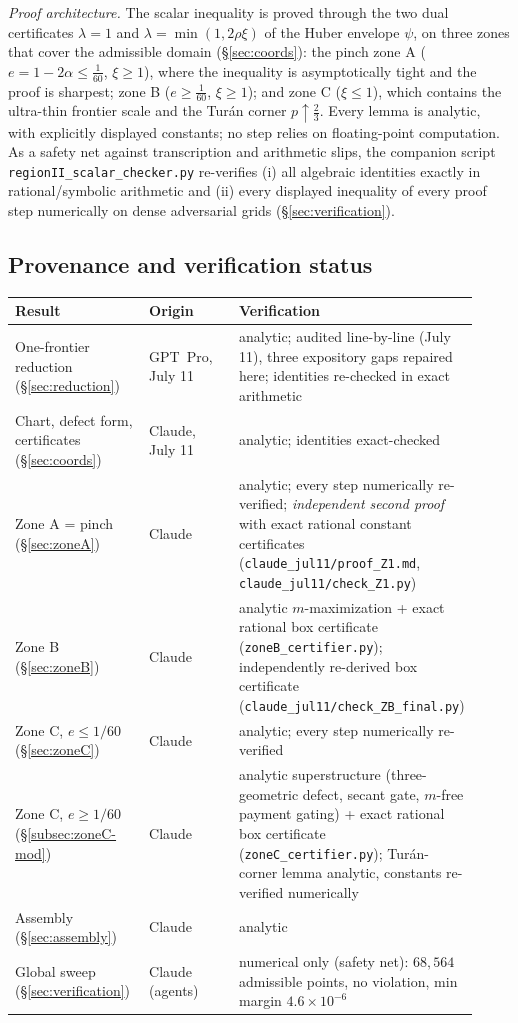 \documentclass[11pt]{article}
\begin{document}
\emph{Proof architecture.}  The scalar inequality is proved through the two
dual certificates $\lambda=1$ and $\lambda=\min(1,2\rho\xi)$ of the Huber
envelope $\psi$, on three zones that cover the admissible domain
(\S\ref{sec:coords}): the pinch zone A ($e=1-2\alpha\le\tfrac1{60}$,
$\xi\ge1$), where the inequality is asymptotically tight and the proof is
sharpest; zone B ($e\ge\tfrac1{60}$, $\xi\ge1$); and zone C ($\xi\le1$),
which contains the ultra-thin frontier scale and the Tur\'an corner
$p\uparrow\tfrac23$.  Every lemma is analytic, with explicitly displayed
constants; no step relies on floating-point computation.  As a safety net
against transcription and arithmetic slips, the companion script
\texttt{regionII\_scalar\_checker.py} re-verifies (i) all algebraic
identities exactly in rational/symbolic arithmetic and (ii) every displayed
inequality of every proof step numerically on dense adversarial grids
(\S\ref{sec:verification}).

\subsection*{Provenance and verification status}

\begin{center}
\small
\begin{tabular}{p{0.30\linewidth}p{0.22\linewidth}p{0.4\linewidth}}
\hline
Result & Origin & Verification \\
\hline
One-frontier reduction (\S\ref{sec:reduction}) & GPT~Pro, July 11 & analytic; audited line-by-line (July 11), three expository gaps repaired here; identities re-checked in exact arithmetic \\
Chart, defect form, certificates (\S\ref{sec:coords}) & Claude, July 11 & analytic; identities exact-checked \\
Zone A = pinch (\S\ref{sec:zoneA}) & Claude & analytic; every step numerically re-verified; \emph{independent second proof} with exact rational constant certificates (\texttt{claude\_jul11/proof\_Z1.md}, \texttt{claude\_jul11/check\_Z1.py}) \\
Zone B (\S\ref{sec:zoneB}) & Claude & analytic $m$-maximization + exact rational box certificate (\texttt{zoneB\_certifier.py}); independently re-derived box certificate (\texttt{claude\_jul11/check\_ZB\_final.py}) \\
Zone C, $e\le1/60$ (\S\ref{sec:zoneC}) & Claude & analytic; every step numerically re-verified \\
Zone C, $e\ge1/60$ (\S\ref{subsec:zoneC-mod}) & Claude & analytic superstructure (three-geometric defect, secant gate, $m$-free payment gating) + exact rational box certificate (\texttt{zoneC\_certifier.py}); Tur\'an-corner lemma analytic, constants re-verified numerically \\
Assembly (\S\ref{sec:assembly}) & Claude & analytic \\
Global sweep (\S\ref{sec:verification}) & Claude (agents) & numerical only (safety net): $68{,}564$ admissible points, no violation, min margin $4.6\times10^{-6}$ \\
\hline
\end{tabular}
\end{center}
\end{document}
